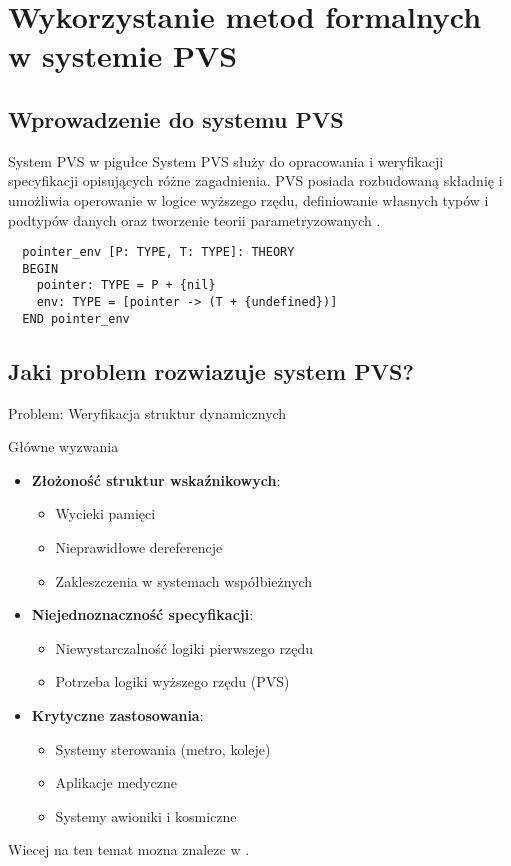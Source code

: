 \documentclass{beamer}
\begin{document}
\section{Wykorzystanie metod formalnych w systemie PVS}
\subsection{Wprowadzenie do systemu PVS}
\begin{frame}[fragile]{System PVS w pigułce}
  System PVS służy do opracowania i weryfikacji specyfikacji opisujących
  różne zagadnienia. PVS posiada rozbudowaną składnię i umożliwia operowanie w
  logice wyższego rzędu, definiowanie własnych typów i podtypów danych oraz
  tworzenie teorii parametryzowanych \cite{paper}.

\begin{verbatim}
  pointer_env [P: TYPE, T: TYPE]: THEORY
  BEGIN
    pointer: TYPE = P + {nil}
    env: TYPE = [pointer -> (T + {undefined})]
  END pointer_env
\end{verbatim}
\end{frame}

\subsection{Jaki problem rozwiazuje system PVS?}
\begin{frame}{Problem: Weryfikacja struktur dynamicznych}
\begin{alertblock}{Główne wyzwania}
  \begin{itemize}
  \item \textbf{Złożoność struktur wskaźnikowych}:
  \begin{itemize}
      \item Wycieki pamięci
      \item Nieprawidłowe dereferencje
      \item Zakleszczenia w systemach współbieżnych
  \end{itemize}
  
  \item \textbf{Niejednoznaczność specyfikacji}:
  \begin{itemize}
      \item Niewystarczalność logiki pierwszego rzędu
      \item Potrzeba logiki wyższego rzędu (PVS)
  \end{itemize}
  
  \item \textbf{Krytyczne zastosowania}:
  \begin{itemize}
      \item Systemy sterowania (metro, koleje)
      \item Aplikacje medyczne
      \item Systemy awioniki i kosmiczne
  \end{itemize}
\end{itemize}

Wiecej na ten temat mozna znalezc w \cite{paper}.
\end{alertblock}
\end{frame}
\end{document}
